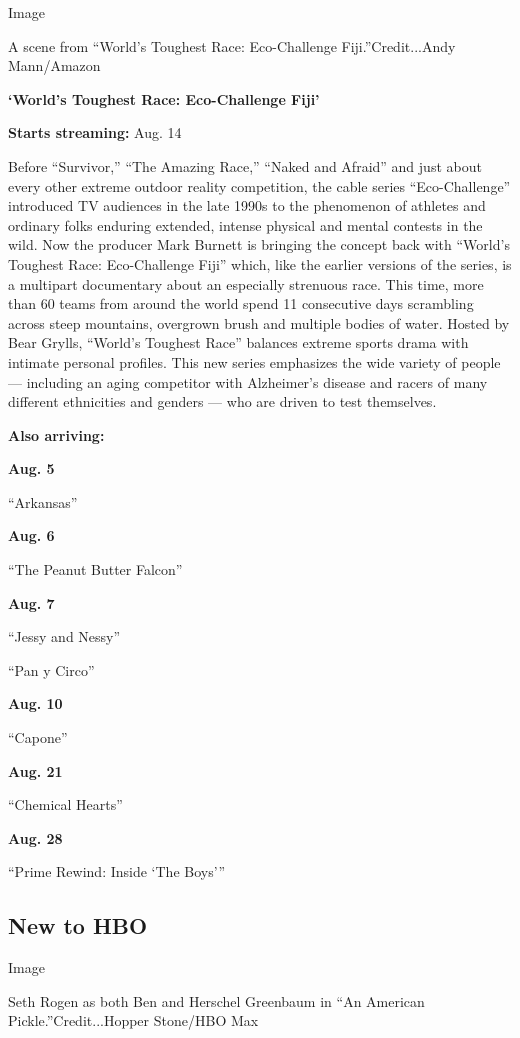 Image

A scene from ``World's Toughest Race: Eco-Challenge Fiji.''Credit...Andy
Mann/Amazon

\textbf{`World's Toughest Race: Eco-Challenge Fiji'}

\textbf{Starts streaming:} Aug. 14

Before ``Survivor,'' ``The Amazing Race,'' ``Naked and Afraid'' and just
about every other extreme outdoor reality competition, the cable series
``Eco-Challenge'' introduced TV audiences in the late 1990s to the
phenomenon of athletes and ordinary folks enduring extended, intense
physical and mental contests in the wild. Now the producer Mark Burnett
is bringing the concept back with ``World's Toughest Race: Eco-Challenge
Fiji'' which, like the earlier versions of the series, is a multipart
documentary about an especially strenuous race. This time, more than 60
teams from around the world spend 11 consecutive days scrambling across
steep mountains, overgrown brush and multiple bodies of water. Hosted by
Bear Grylls, ``World's Toughest Race'' balances extreme sports drama
with intimate personal profiles. This new series emphasizes the wide
variety of people --- including an aging competitor with Alzheimer's
disease and racers of many different ethnicities and genders --- who are
driven to test themselves.

\textbf{Also arriving:}

\textbf{Aug. 5}

``Arkansas''

\textbf{Aug. 6}

``The Peanut Butter Falcon''

\textbf{Aug. 7}

``Jessy and Nessy''

``Pan y Circo''

\textbf{Aug. 10}

``Capone''

\textbf{Aug. 21}

``Chemical Hearts''

\textbf{Aug. 28}

``Prime Rewind: Inside `The Boys'''

\hypertarget{new-to-hbo}{%
\subsection{New to HBO}\label{new-to-hbo}}

Image

Seth Rogen as both Ben and Herschel Greenbaum in ``An American
Pickle.''Credit...Hopper Stone/HBO Max

